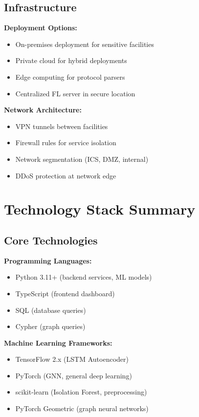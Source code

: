 \documentclass[12pt,a4paper]{article}
\begin{document}
\subsection{Infrastructure}

\textbf{Deployment Options:}
\begin{itemize}[leftmargin=1cm,itemsep=0pt]
    \item On-premises deployment for sensitive facilities
    \item Private cloud for hybrid deployments
    \item Edge computing for protocol parsers
    \item Centralized FL server in secure location
\end{itemize}

\textbf{Network Architecture:}
\begin{itemize}[leftmargin=1cm,itemsep=0pt]
    \item VPN tunnels between facilities
    \item Firewall rules for service isolation
    \item Network segmentation (ICS, DMZ, internal)
    \item DDoS protection at network edge
\end{itemize}

\section{Technology Stack Summary}

\subsection{Core Technologies}

\textbf{Programming Languages:}
\begin{itemize}[leftmargin=1cm,itemsep=0pt]
    \item Python 3.11+ (backend services, ML models)
    \item TypeScript (frontend dashboard)
    \item SQL (database queries)
    \item Cypher (graph queries)
\end{itemize}

\textbf{Machine Learning Frameworks:}
\begin{itemize}[leftmargin=1cm,itemsep=0pt]
    \item TensorFlow 2.x (LSTM Autoencoder)
    \item PyTorch (GNN, general deep learning)
    \item scikit-learn (Isolation Forest, preprocessing)
    \item PyTorch Geometric (graph neural networks)
\end{itemize}
\end{document}
